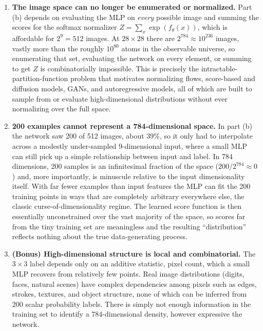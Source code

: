 \documentclass[11pt]{article}
\begin{document}
\begin{enumerate}[label=\textbf{\arabic*.}, leftmargin=*]
\item \textbf{The image space can no longer be enumerated or normalized.}
Part (b) depends on evaluating the MLP on \emph{every} possible image and
summing the scores for the softmax normalizer $Z = \sum_{x} \exp(f_\theta(x))$,
which is affordable for $2^9 = 512$ images. At $28\times 28$ there are
$2^{784} \approx 10^{236}$ images, vastly more than the roughly $10^{80}$ atoms
in the observable universe, so enumerating that set, evaluating the network on
every element, or summing to get $Z$ is combinatorially impossible. This is
precisely the intractable-partition-function problem that motivates normalizing
flows, score-based and diffusion models, GANs, and autoregressive models, all
of which are built to sample from or evaluate high-dimensional distributions
without ever normalizing over the full space.

\item \textbf{200 examples cannot represent a 784-dimensional space.} In part
(b) the network saw 200 of 512 images, about 39\%, so it only had to
interpolate across a modestly under-sampled 9-dimensional input, where a small
MLP can still pick up a simple relationship between input and label. In 784
dimensions, 200 samples is an infinitesimal fraction of the space
($200/2^{784} \approx 0$) and, more importantly, is minuscule relative to the
input dimensionality itself. With far fewer examples than input features the
MLP can fit the 200 training points in ways that are completely arbitrary
everywhere else, the classic curse-of-dimensionality regime. The learned score
function is then essentially unconstrained over the vast majority of the space,
so scores far from the tiny training set are meaningless and the resulting
``distribution'' reflects nothing about the true data-generating process.

\item \textbf{(Bonus) High-dimensional structure is local and combinatorial.}
The $3\times 3$ label depends only on an additive statistic, pixel count, which
a small MLP recovers from relatively few points. Real image distributions
(digits, faces, natural scenes) have complex dependencies among pixels such as
edges, strokes, textures, and object structure, none of which can be inferred
from 200 scalar probability labels. There is simply not enough information in
the training set to identify a 784-dimensional density, however expressive the
network.
\end{enumerate}
\end{document}
